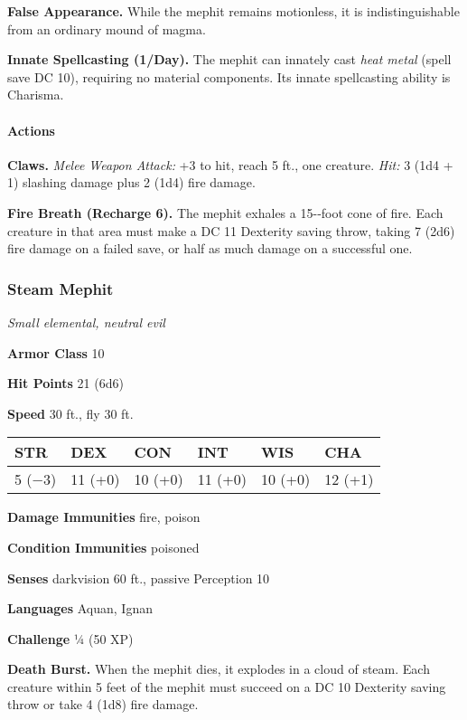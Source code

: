 \documentclass[
]{article}
\begin{document}
\textbf{False Appearance.} While the mephit remains motionless, it is
indistinguishable from an ordinary mound of magma.

\textbf{Innate Spellcasting (1/Day).} The mephit can innately cast
\emph{heat metal} (spell save DC 10), requiring no material components.
Its innate spellcasting ability is Charisma.

\hypertarget{actions-5}{%
\paragraph{Actions}\label{actions-5}}

\textbf{Claws.} \emph{Melee Weapon Attack:} +3 to hit, reach 5 ft., one
creature. \emph{Hit:} 3 (1d4 + 1) slashing damage plus 2 (1d4) fire
damage.

\textbf{Fire Breath (Recharge 6).} The mephit exhales a 15-­‐foot cone
of fire. Each creature in that area must make a DC 11 Dexterity saving
throw, taking 7 (2d6) fire damage on a failed save, or half as much
damage on a successful one.

\hypertarget{steam-mephit}{%
\subsubsection{Steam Mephit}\label{steam-mephit}}

\emph{Small elemental, neutral evil}

\textbf{Armor Class} 10

\textbf{Hit Points} 21 (6d6)

\textbf{Speed} 30 ft., fly 30 ft.

\begin{longtable}[]{@{}llllll@{}}
\toprule
STR & DEX & CON & INT & WIS & CHA\tabularnewline
\midrule
\endhead
5 (−3) & 11 (+0) & 10 (+0) & 11 (+0) & 10 (+0) & 12 (+1)\tabularnewline
\bottomrule
\end{longtable}

\textbf{Damage Immunities} fire, poison

\textbf{Condition Immunities} poisoned

\textbf{Senses} darkvision 60 ft., passive Perception 10

\textbf{Languages} Aquan, Ignan

\textbf{Challenge} ¼ (50 XP)

\textbf{Death Burst.} When the mephit dies, it explodes in a cloud of
steam. Each creature within 5 feet of the mephit must succeed on a DC 10
Dexterity saving throw or take 4 (1d8) fire damage.
\end{document}
